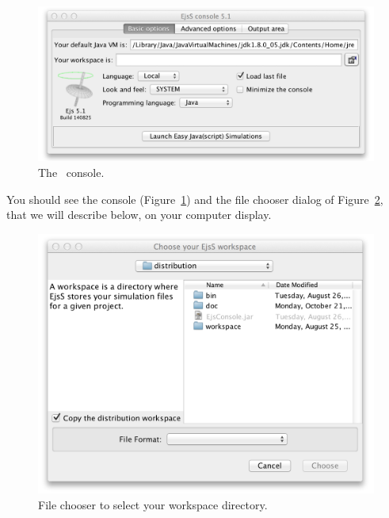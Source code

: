 \begin{figure}[htb]
  \centering
  \includegraphics[scale=\scale]{01Introduction/images/EjsConsole1.png}
  \caption{The \ejs\ console.}
  \label{fig:01Introduction/EjsConsole}
\end{figure}

You should see the console (Figure~\ref{fig:01Introduction/EjsConsole}) and the file chooser dialog of Figure~\ref{fig:01Introduction/WorkspaceChooser}, that we will describe below, on your computer display.

\begin{figure}[htb]
  \centering
  \includegraphics[scale=\scale]{01Introduction/images/WorkspaceChooser.png}
  \caption{File chooser to select your workspace directory.}
  \label{fig:01Introduction/WorkspaceChooser}
\end{figure}

